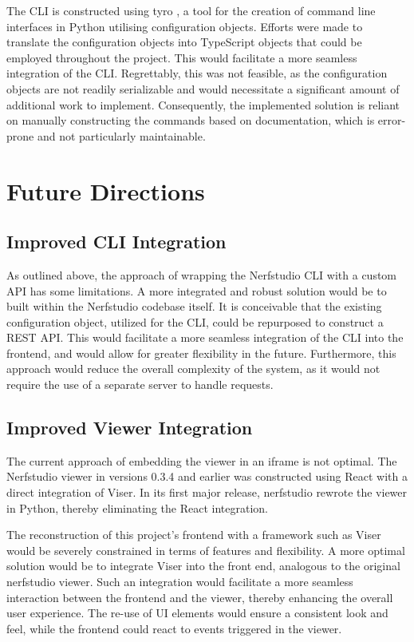 The CLI is constructed using tyro \cite{yi_tyro_nodate}, a tool for the creation of command line interfaces in Python utilising configuration objects.
Efforts were made to translate the configuration objects into TypeScript objects that could be employed throughout the project.
This would facilitate a more seamless integration of the CLI.
Regrettably, this was not feasible, as the configuration objects are not readily serializable and would necessitate a significant amount of additional work to implement.
Consequently, the implemented solution is reliant on manually constructing the commands based on documentation, which is error-prone and not particularly maintainable.
\section{Future Directions}
\label{sec:system:future}

\subsection*{Improved CLI Integration}

As outlined above, the approach of wrapping the Nerfstudio CLI with a custom API has some limitations.
A more integrated and robust solution would be to built within the Nerfstudio codebase itself.
It is conceivable that the existing configuration object, utilized for the CLI, could be repurposed to construct a REST API.
This would facilitate a more seamless integration of the CLI into the frontend, and would allow for greater flexibility in the future.
Furthermore, this approach would reduce the overall complexity of the system, as it would not require the use of a separate server to handle requests.

\subsection*{Improved Viewer Integration}

The current approach of embedding the viewer in an iframe is not optimal.
The Nerfstudio viewer in versions 0.3.4 and earlier was constructed using React with a direct integration of Viser.
In its first major release, nerfstudio rewrote the viewer in Python, thereby eliminating the React integration.

The reconstruction of this project's frontend with a framework such as Viser would be severely constrained in terms of features and flexibility.
A more optimal solution would be to integrate Viser into the front end, analogous to the original nerfstudio viewer.
Such an integration would facilitate a more seamless interaction between the frontend and the viewer, thereby enhancing the overall user experience.
The re-use of UI elements would ensure a consistent look and feel, while the frontend could react to events triggered in the viewer.